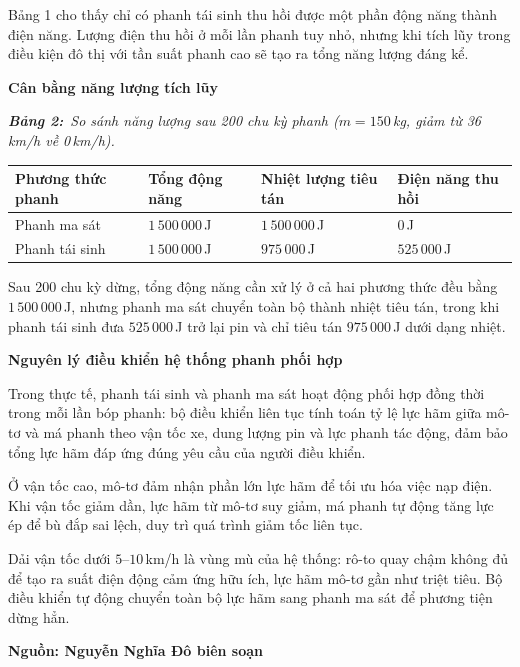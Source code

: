 \documentclass[12pt,a4paper,twoside]{article}
\newcommand{\tablecaption}[2]{%
    \par\vspace{2pt}%
    {\centering\textbf{\textit{Bảng #1:}}~\textit{#2}\par}%
    \vspace{0pt}%
}
\newenvironment{readingpassage}[1][]{%
    \begin{tcolorbox}[enhanced, colback=grayLight, colframe=secondaryBlue,
        coltitle=textDark, fonttitle=\bfseries, title={#1},
        rounded corners, arc=3mm, boxrule=1pt,
        left=15pt, right=15pt, top=10pt, bottom=10pt,
        breakable, before skip=10pt, after skip=10pt, drop fuzzy shadow]
    \setstretch{1.3}
}{\end{tcolorbox}}
\begin{document}
\begin{readingpassage}[]
Bảng 1 cho thấy chỉ có phanh tái sinh thu hồi được một phần động năng thành điện năng. Lượng điện thu hồi ở mỗi lần phanh tuy nhỏ, nhưng khi tích lũy trong điều kiện đô thị với tần suất phanh cao sẽ tạo ra tổng năng lượng đáng kể.

\textbf{Cân bằng năng lượng tích lũy}

\tablecaption{2}{So sánh năng lượng sau 200 chu kỳ phanh ($m = 150$\,kg, giảm từ 36\,km/h về 0\,km/h).}
\renewcommand{\arraystretch}{1.4}
{\small
\begin{center}
\begin{tabular}{|>{\raggedright\arraybackslash}m{3cm}|>{\centering\arraybackslash}m{2.5cm}|>{\centering\arraybackslash}m{2.8cm}|>{\centering\arraybackslash}m{2.8cm}|}
\hline
\rowcolor{primaryBlue!12}
\textbf{Phương thức phanh} & \textbf{Tổng động năng} & \textbf{Nhiệt lượng tiêu tán} & \textbf{Điện năng thu hồi} \\
\hline
Phanh ma sát & $1\,500\,000$\,J & $1\,500\,000$\,J & $0$\,J \\
\hline
Phanh tái sinh & $1\,500\,000$\,J & $975\,000$\,J & $525\,000$\,J \\
\hline
\end{tabular}
\end{center}
}

Sau 200 chu kỳ dừng, tổng động năng cần xử lý ở cả hai phương thức đều bằng $1\,500\,000$\,J, nhưng phanh ma sát chuyển toàn bộ thành nhiệt tiêu tán, trong khi phanh tái sinh đưa $525\,000$\,J trở lại pin và chỉ tiêu tán $975\,000$\,J dưới dạng nhiệt.

\textbf{Nguyên lý điều khiển hệ thống phanh phối hợp}

Trong thực tế, phanh tái sinh và phanh ma sát hoạt động phối hợp đồng thời trong mỗi lần bóp phanh: bộ điều khiển liên tục tính toán tỷ lệ lực hãm giữa mô-tơ và má phanh theo vận tốc xe, dung lượng pin và lực phanh tác động, đảm bảo tổng lực hãm đáp ứng đúng yêu cầu của người điều khiển.

Ở vận tốc cao, mô-tơ đảm nhận phần lớn lực hãm để tối ưu hóa việc nạp điện. Khi vận tốc giảm dần, lực hãm từ mô-tơ suy giảm, má phanh tự động tăng lực ép để bù đắp sai lệch, duy trì quá trình giảm tốc liên tục.

Dải vận tốc dưới $5$--$10$\,km/h là vùng mù của hệ thống: rô-to quay chậm không đủ để tạo ra suất điện động cảm ứng hữu ích, lực hãm mô-tơ gần như triệt tiêu. Bộ điều khiển tự động chuyển toàn bộ lực hãm sang phanh ma sát để phương tiện dừng hẳn.

\hfill\textbf{Nguồn: Nguyễn Nghĩa Đô biên soạn}
\end{readingpassage}
\end{document}
